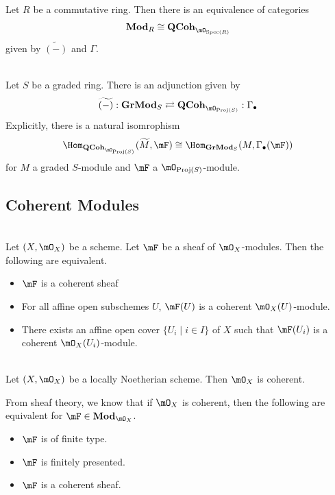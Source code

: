 \documentclass[a4paper]{article}
\begin{document}
\begin{prp}{}{}\\
Let $R$ be a commutative ring. Then there is an equivalence of categories $$\bold{Mod}_R\cong\bold{QCoh}_{\mO_{\text{Spec}(R)}}$$ given by $\widetilde{(-)}$ and $\Gamma$. 
\end{prp}

\begin{prp}{}{}\\
Let $S$ be a graded ring. There is an adjunction given by $$\widetilde{(-)}:\bold{GrMod}_S\rightleftarrows\bold{QCoh}_{\mO_{\text{Proj}(S)}}:\Gamma_\bullet$$ Explicitly, there is a natural isomrophism $$\Hom_{\bold{QCoh}_{\mO_{\text{Proj}(S)}}}(\widetilde{M},\mF)\cong\Hom_{\bold{GrMod}_S}(M,\Gamma_\bullet(\mF))$$ for $M$ a graded $S$-module and $\mF$ a $\mO_{\text{Proj}(S)}$-module. 
\end{prp}

\subsection{Coherent Modules}
\begin{prp}{}{}\\
Let $(X,\mO_X)$ be a scheme. Let $\mF$ be a sheaf of $\mO_X$-modules. Then the following are equivalent. 
\begin{itemize}
\item $\mF$ is a coherent sheaf
\item For all affine open subschemes $U$, $\mF(U)$ is a coherent $\mO_X(U)$-module. 
\item There exists an affine open cover $\{U_i\;|\;i\in I\}$ of $X$ such that $\mF(U_i)$ is a coherent $\mO_X(U_i)$-module. 
\end{itemize}
\end{prp}
\begin{prp}{}{}\\
Let $(X,\mO_X)$ be a locally Noetherian scheme. Then $\mO_X$ is coherent. 
\end{prp}

From sheaf theory, we know that if $\mO_X$ is coherent, then the following are equivalent for $\mF\in\bold{Mod}_{\mO_X}$. 
\begin{itemize}
\item $\mF$ is of finite type. 
\item $\mF$ is finitely presented. 
\item $\mF$ is a coherent sheaf. 
\end{itemize}
\end{document}
